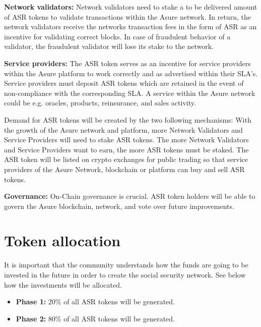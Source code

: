 \textbf{Network validators:}
Network validators need to stake a to be delivered amount of ASR tokens to validate transactions within the Asure network. In return, the network validators receive the networks transaction fees in the form of ASR as an incentive for validating correct blocks. In case of fraudulent behavior of a validator, the fraudulent validator will lose its stake to the network.

\textbf{Service providers:}
The ASR token serves as an incentive for service providers within the Asure platform to work correctly and as advertised within their SLA’s. Service providers must deposit ASR tokens which are retained in the event of non-compliance with the corresponding SLA. A service within the Asure network could be e.g. oracles, products, reinsurance, and sales activity.\newline

Demand for ASR tokens will be created by the two following mechanisms: With the growth of the Asure network and platform, more Network Validators and Service Providers will need to stake ASR tokens. The more Network Validators and Service Providers want to earn, the more ASR tokens must be staked.\newline
The ASR token will be listed on crypto exchanges for public trading so that service providers of the Asure Network, blockchain or platform can buy and sell ASR tokens.\newline

\textbf{Governance:}
On-Chain governance is crucial. ASR token holders will be able to govern the Asure blockchain, network, and vote over future improvements.
\newline\newline


\section{Token allocation}

It is important that the community understands how the funds are going to be invested in the future in order to create the social security network. See below how the investments will be allocated.

\begin{itemize}
\item \textbf{Phase 1:} 20\% of all ASR tokens will be generated.
\item \textbf{Phase 2:} 80\% of all ASR tokens will be generated.
\end{itemize}

